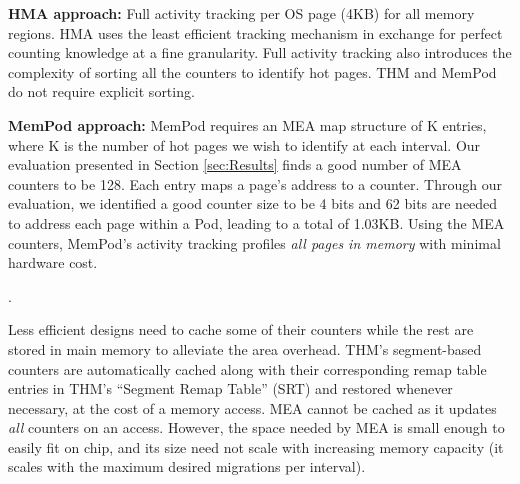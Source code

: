 	\textbf{HMA approach:} Full activity tracking per OS page (4KB) for all memory regions. HMA uses the least efficient tracking mechanism in exchange for perfect counting knowledge at a fine granularity. Full activity tracking also introduces the complexity of sorting all the counters to identify hot pages. THM and MemPod do not require explicit sorting.
	
	\textbf{MemPod approach:} MemPod requires an MEA map structure of K entries, where K is the number of hot pages we wish to identify at each interval. Our evaluation presented in Section \ref{sec:Results} finds a good number of MEA counters to be 128. Each entry maps a page's address to a counter. Through our evaluation, we identified a good counter size to be 4 bits and 62 bits are needed to address each page within a Pod, leading to a total of 1.03KB. Using the MEA counters, MemPod's activity tracking profiles \textit{all pages in memory} with minimal hardware cost. 

.
	

Less efficient designs need to cache some of their counters while the rest are stored in main memory to alleviate the area overhead. THM's segment-based 
counters are automatically cached along with their corresponding remap table entries in THM's ``Segment Remap Table'' (SRT) and restored whenever necessary, at the cost of a memory access. 
MEA cannot be cached as it updates \textit{all} counters on an access. 
However, the space needed by MEA is small enough to easily fit on chip,
and its size need not scale with increasing memory capacity (it scales with
the maximum desired migrations per interval).


